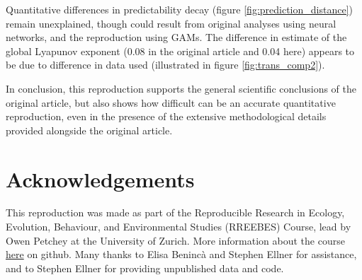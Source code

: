 \documentclass[10pt,a4paper,onecolumn]{article}
\begin{document}
Quantitative differences in predictability decay (figure
\ref{fig:prediction_distance}) remain unexplained, though could result
from original analyses using neural networks, and the reproduction using
GAMs. The difference in estimate of the global Lyapunov exponent (0.08
in the original article and 0.04 here) appears to be due to difference
in data used (illustrated in figure \ref{fig:trans_comp2}).

In conclusion, this reproduction supports the general scientific
conclusions of the original article, but also shows how difficult can be
an accurate quantitative reproduction, even in the presence of the
extensive methodological details provided alongside the original
article.

\section{Acknowledgements}\label{acknowledgements}

This reproduction was made as part of the Reproducible Research in
Ecology, Evolution, Behaviour, and Environmental Studies (RREEBES)
Course, lead by Owen Petchey at the University of Zurich. More
information about the course
\href{https://github.com/opetchey/RREEBES/blob/master/README.md}{here}
on github. Many thanks to Elisa Benincà and Stephen Ellner for
assistance, and to Stephen Ellner for providing unpublished data and
code.

{\sffamily \small
  \printbibliography[title=References]
}
\end{document}
